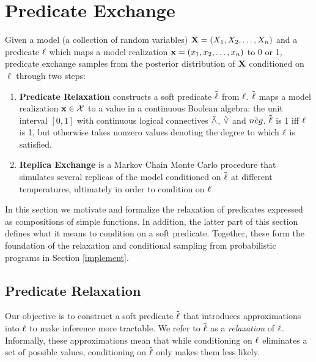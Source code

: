 \section{Predicate Exchange}

Given a model (a collection of random variables)  $\mathbf{X} = (X_1, X_2, \dots, X_n)$ and a predicate $\operatorname{\ell}$ which maps a model realization  $\mathbf{x} = (x_1, x_2, \dots, x_n)$ to 0 or 1, predicate exchange samples from the posterior distribution of $\mathbf{X}$ conditioned on $\ell$ through two steps:
\begin{enumerate}
\item \textbf{Predicate Relaxation} constructs a soft predicate $\mathrel{\tilde{\operatorname{\ell}}}$ from $\operatorname{\ell}$. $\mathrel{\tilde{\operatorname{\ell}}}$ maps a model realization $\mathbf{x} \in {\mathcal{X}}$ to a value in a continuous Boolean algebra: the unit interval $[0, 1]$ with continuous logical connectives $\mathrel{\tilde{\land}}$, $\mathrel{\tilde{\lor}}$ and $\mathrel{\tilde{neg}}$.
$\mathrel{\tilde{\operatorname{\ell}}}$ is 1 iff $\operatorname{\ell}$ is 1, but otherwise takes nonzero values denoting the degree to which $\operatorname{\ell}$ is satisfied.
\item  \textbf{Replica Exchange} is a Markov Chain Monte Carlo procedure that simulates several replicas  of the model conditioned on $\mathrel{\tilde{\operatorname{\ell}}}$ at different temperatures, ultimately in order to condition on $\operatorname{\ell}$. 
\end{enumerate}

In this section we motivate and formalize the relaxation of predicates expressed as compositions of simple functions.
In addition, the latter part of this section defines what it means to condition on a soft predicate.
Together, these form the foundation of the relaxation and conditional sampling from probabilistic programs in Section \ref{implement}.



\subsection{Predicate Relaxation}\label{predexchange}

Our objective is to construct a soft predicate $\mathrel{\tilde{\operatorname{\ell}}}$ that introduces approximations into $\operatorname{\ell}$ to make inference more tractable.
We refer to $\mathrel{\tilde{\operatorname{\ell}}}$ as a \emph{relaxation} of $\operatorname{\ell}$.
Informally, these approximations mean that while conditioning on $\operatorname{\ell}$ eliminates a set of possible values, conditioning on $\mathrel{\tilde{\operatorname{\ell}}}$ only makes them less likely.

